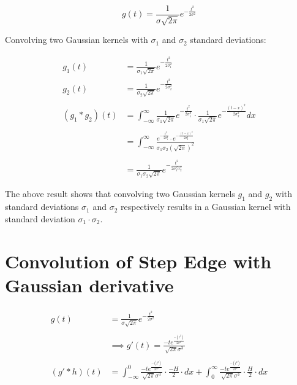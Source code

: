 \documentclass[12pt, oneside]{article}
\begin{document}
$$ g(t) = \frac{1}{\sigma \sqrt{2 \pi}}e^{-\frac{t^2}{2 \sigma ^ 2}} $$

Convolving two Gaussian kernels with $\sigma_1$ and $\sigma_2$ standard
deviations:

\begin{align*}
    g_1(t) &= \frac{1}{\sigma_1 \sqrt{2 \pi}}e^{-\frac{t^2}{2 \sigma_1 ^ 2}}  \\
    g_2(t) &= \frac{1}{\sigma_2 \sqrt{2 \pi}}e^{-\frac{t^2}{2 \sigma_2 ^ 2}}  \\\\
    (g_1 * g_2)(t) &= 
    \int_{-\infty}^{\infty} 
    \frac{1}{\sigma_1 \sqrt{2 \pi}}e^{-\frac{t^2}{2 \sigma_1 ^ 2}} 
    \cdot
    \frac{1}{\sigma_1 \sqrt{2 \pi}}e^{-\frac{(t-x)^2}{2 \sigma_2 ^ 2}} dx  \\\\
    &= \int_{-\infty}^{\infty} 
    \frac{  e^{-\frac{t^2}{2 \sigma_1 ^ 2}} \cdot 
            e^{-\frac{(t-x)^2}{2 \sigma_2 ^ 2}}}{ 
                \sigma_1 \sigma_2 (\sqrt{2 \pi})^2}    \\\\
    &= \frac{1}{\sigma_1 \sigma_2 \sqrt{2 \pi}}
    e^{-\frac{t^2}{2 \sigma_1 ^ 2 \sigma_2 ^ 2 }} 
\end{align*}

The above result shows that convolving two Gaussian kernels $g_1$ and $g_2$
with standard deviations $\sigma_1$ and $\sigma_2$ respectively results in
a Gaussian kernel with standard deviation $\sigma_1 \cdot \sigma_2$.

\section{Convolution of Step Edge with Gaussian derivative}

\begin{align*}
    g(t) &= \frac{1}{\sigma \sqrt{2 \pi}}e^{-\frac{t^2}{2 \sigma ^ 2}}  \\\\
    &\implies g'(t) =  \frac{-t e^{\frac{-(t ^ 2)}{2 \sigma ^ 2}} }{ 
    \sqrt{2 \pi} \sigma ^ 3} \\\\
    (g' * h)(t) &= 
    \int_{-\infty}^{0} 
    \frac{-t e^{\frac{-(t ^ 2)}{2 \sigma ^ 2}} }{ 
    \sqrt{2 \pi} \sigma ^ 3}
    \cdot
    \frac{-H}{2} \cdot dx  +
    \int_{0}^{\infty} 
    \frac{-t e^{\frac{-(t ^ 2)}{2 \sigma ^ 2}} }{ 
    \sqrt{2 \pi} \sigma ^ 3}
    \cdot
    \frac{H}{2} \cdot dx  
\end{align*}
\end{document}
